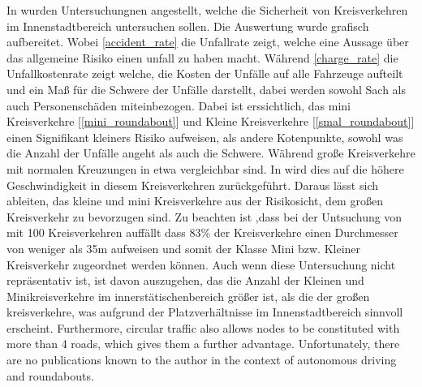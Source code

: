 
In \cite{Baumert1998, brilon2002verkehrssicherheit, brilon2004uberprufung,voss1994verkehrssicherheit} wurden Untersuchungnen angestellt, welche die Sicherheit von Kreisverkehren im Innenstadtbereich untersuchen sollen. Die Auswertung wurde grafisch aufbereitet.
Wobei \cref{accident_rate} die Unfallrate zeigt, welche eine Aussage über das allgemeine Risiko einen unfall zu haben macht. 
Während \cref{charge_rate} die Unfallkostenrate zeigt welche, die Kosten der Unfälle auf alle Fahrzeuge aufteilt und ein Maß für die Schwere der Unfälle darstellt, dabei werden sowohl Sach als auch Personenschäden
miteinbezogen. Dabei ist erssichtlich, das mini Kreisverkehre [\cref{mini_roundabout}] und Kleine Kreisverkehre [\cref{smal_roundabout}] einen Signifikant kleiners Risiko aufweisen, als andere Kotenpunkte, sowohl was die Anzahl der Unfälle angeht
als auch die Schwere. Während große Kreisverkehre mit normalen Kreuzungen in etwa vergleichbar sind. In \cite{Bondzio2012} wird dies auf die höhere Geschwindigkeit in diesem Kreisverkehren
zurückgeführt. Daraus lässt sich ableiten, das kleine und mini Kreisverkehre aus der Risikosicht, dem großen Kreisverkehr zu bevorzugen sind. Zu beachten ist ,dass bei der Untsuchung von \cite{Bondzio2012} mit 100 Kreisverkehren auffällt dass  83\% der Kreisverkehre einen Durchmesser von weniger als 35m aufweisen und somit
der Klasse Mini bzw. Kleiner Kreisverkehr zugeordnet werden können. Auch wenn diese Untersuchung nicht repräsentativ ist, ist davon auszugehen, das die Anzahl der Kleinen und Minikreisverkehre im 
innerstätischenbereich größer ist, als die der großen kreisverkehre, was aufgrund der Platzverhältnisse im Innenstadtbereich sinnvoll erscheint.
Furthermore, circular traffic also allows nodes to be constituted with more than 4 roads, which gives them a further advantage.
Unfortunately, there are no publications known to the author in the context of autonomous driving and roundabouts.






